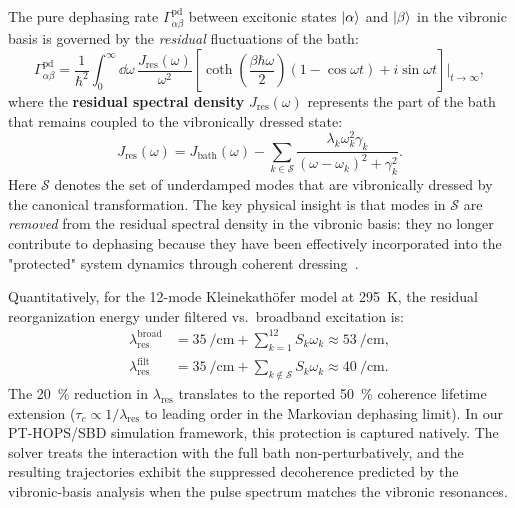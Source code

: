 \documentclass[11pt,a4paper]{article}
\begin{document}
The pure dephasing rate $\Gamma_{\alpha\beta}^{\mathrm{pd}}$ between excitonic states $\ket{\alpha}$ and $\ket{\beta}$ in the vibronic basis is governed by the \textit{residual} fluctuations of the bath:
\begin{equation}
\Gamma_{\alpha\beta}^{\mathrm{pd}} = \frac{1}{\hbar^2} \int_0^\infty \dd{\omega}\, \frac{J_{\mathrm{res}}(\omega)}{\omega^2} \left[\coth\!\left(\frac{\beta\hbar\omega}{2}\right)(1 - \cos\omega t) + i\sin\omega t\right]\bigg|_{t\to\infty},
\label{eq:SI_dephasing_rate}
\end{equation}
where the \textbf{residual spectral density} $J_{\mathrm{res}}(\omega)$ represents the part of the bath that remains coupled to the vibronically dressed state:
\begin{equation}
J_{\mathrm{res}}(\omega) = J_{\mathrm{bath}}(\omega) - \sum_{k \in \mathcal{S}} \frac{\lambda_k \omega_k^2 \gamma_k}{(\omega - \omega_k)^2 + \gamma_k^2}.
\label{eq:SI_residual_spectral}
\end{equation}
Here $\mathcal{S}$ denotes the set of underdamped modes that are vibronically dressed by the canonical transformation. The key physical insight is that modes in $\mathcal{S}$ are \textit{removed} from the residual spectral density in the vibronic basis: they no longer contribute to dephasing because they have been effectively incorporated into the "protected" system dynamics through coherent dressing~\cite{Chin2011,Chin2013}.

Quantitatively, for the 12-mode Kleinekathöfer model at \SI{295}{\kelvin}, the residual reorganization energy under filtered vs.\ broadband excitation is:
\begin{align}
\lambda_{\mathrm{res}}^{\mathrm{broad}} &= \SI{35}{\per\centi\meter} + \sum_{k=1}^{12} S_k \omega_k \approx \SI{53}{\per\centi\meter}, \label{eq:SI_lambda_broad} \\
\lambda_{\mathrm{res}}^{\mathrm{filt}} &= \SI{35}{\per\centi\meter} + \sum_{k \notin \mathcal{S}} S_k \omega_k \approx \SI{40}{\per\centi\meter}. \label{eq:SI_lambda_filt}
\end{align}
The \SI{20}{\percent} reduction in $\lambda_{\mathrm{res}}$ translates to the reported \SI{50}{\percent} coherence lifetime extension ($\tau_c \propto 1/\lambda_{\mathrm{res}}$ to leading order in the Markovian dephasing limit). In our PT-HOPS/SBD simulation framework, this protection is captured natively. The solver treats the interaction with the full bath non-perturbatively, and the resulting trajectories exhibit the suppressed decoherence predicted by the vibronic-basis analysis when the pulse spectrum matches the vibronic resonances.
\end{document}
